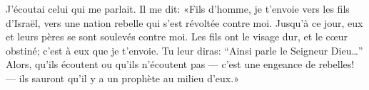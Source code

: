 J’écoutai celui qui me parlait.
Il me dit: «Fils d’homme, je t’envoie vers les fils d’Israël,
	vers une nation rebelle qui s’est révoltée contre moi.
Jusqu’à ce jour, eux et leurs pères se sont soulevés contre moi.
Les fils ont le visage dur, et le cœur obstiné; c’est à eux que je t’envoie.
Tu leur diras: “Ainsi parle le Seigneur Dieu…”
	Alors, qu’ils écoutent ou qu’ils n’écoutent pas
	--- c’est une engeance de rebelles! --- 
	ils sauront qu’il y a un prophète au milieu d’eux.»
